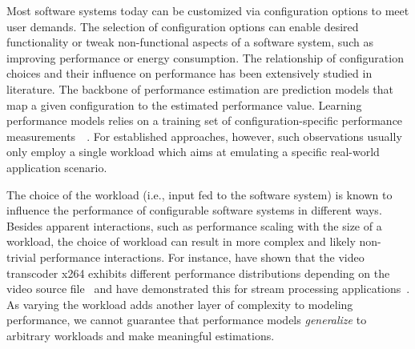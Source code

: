 
Most software systems today can be customized via configuration options to meet user demands. The selection of configuration options can enable desired functionality or tweak non-functional aspects of a software system, such as improving performance or energy consumption. The relationship of configuration choices and their influence on performance has been extensively studied in literature. The backbone of performance estimation are prediction models that map a given configuration to the estimated performance value. Learning performance models relies on a training set of configuration-specific performance measurements~~\cite{dorn2020,siegmundPerformanceinfluenceModelsHighly2015,haDeepPerf2019,perfAL,guoVariabilityawarePerformancePrediction2013,sarkarCostEfficientSamplingPerformance,guo_2018_data,fourier_learning_2015,perLasso}. For established approaches, however, such observations usually only employ a single workload which aims at emulating a specific real-world application scenario.

The choice of the workload (i.e., input fed to the software system) is known to influence the performance of configurable software systems in different ways. Besides apparent interactions, such as performance scaling with the size of a workload, the choice of workload can result in more complex and likely non-trivial performance interactions. For instance, \citeauthor{alves_sampling_2020} have shown that the video transcoder \textsf{x264} exhibits different performance distributions depending on the video source file~\cite{alves_sampling_2020} and \citeauthor{liao_2020_using_emse} have demonstrated this for stream processing applications~\cite{liao_2020_using_emse}. As varying the workload adds another layer of complexity to modeling performance, we cannot guarantee that performance models \textit{generalize} to arbitrary workloads and make meaningful estimations. 

